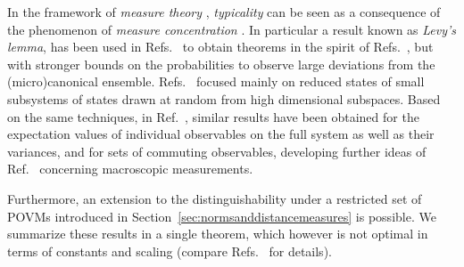 \documentclass[a4paper,12pt,listof=totoc,index=totoc,bibliography=totoc,headsepline=false,headings=normal,BCOR16.153846mm,DIV12,headinclude,twoside,cleardoublepage=empty,numbers=noenddot,final]{scrreprt}
\theoremstyle{mystyle}
\numberwithin{equation}{section}
\numberwithin{figure}{section}
\numberwithin{lemma}{section}
\numberwithin{theorem}{section}
\numberwithin{corollary}{section}
\numberwithin{definition}{section}
\numberwithin{conjecture}{section}
\numberwithin{observation}{section}
\newcommand{\+}{\mkern2mu}
\DeclareMathOperator{\1}{\mathds{1}}
\begin{document}
In the framework of \emph{measure theory} \cite{halmos}, \emph{typicality} can be seen as a consequence of the phenomenon of \emph{measure concentration} \cite{ledoux01,CHATTERJEE07}.
In particular a result known as \emph{Levy's lemma}, has been used in Refs.~\cite{Popescu06,Popescu05} to obtain theorems in the spirit of Refs.~\cite{slloydthesis,Goldstein06}, but with stronger bounds on the probabilities to observe large deviations from the (micro)canonical ensemble.
Refs.~\cite{Popescu06,Popescu05} focused mainly on reduced states of small subsystems of states drawn at random from high dimensional subspaces.
Based on the same techniques, in Ref.~\cite{Gogolin10-masterthesis}, similar results have been obtained for the expectation values of individual observables on the full system as well as their variances, and for sets of commuting observables, developing further ideas of Ref.~\cite{vonneumann1929} concerning macroscopic measurements.

Furthermore, an extension to the distinguishability under a restricted set of POVMs introduced in Section~\ref{sec:normsanddistancemeasures} is possible.
We summarize these results in a single theorem, which however is not optimal in terms of constants and scaling (compare Refs.~\cite{Popescu05,Gogolin10-masterthesis} for details).
\end{document}
